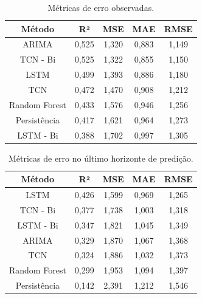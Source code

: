 
\begin{table}[h] %
    \centering
    \begin{tabular}{|c|c|c|c|c|}
    \hline
    \textbf{Método} & \textbf{R²} & \textbf{MSE} & \textbf{MAE} & \textbf{RMSE} \\ \hline
    ARIMA & 0,525 & 1,320 & 0,883 & 1,149 \\ \hline
    TCN - Bi & 0,525 & 1,322 & 0,855 & 1,150 \\ \hline
    LSTM & 0,499 & 1,393 & 0,886 & 1,180 \\ \hline
    TCN & 0,472 & 1,470 & 0,908 & 1,212 \\ \hline
    Random Forest & 0,433 & 1,576 & 0,946 & 1,256 \\ \hline
    Persistência & 0,417 & 1,621 & 0,964 & 1,273 \\ \hline
    LSTM - Bi & 0,388 & 1,702 & 0,997 & 1,305 \\ \hline
    \end{tabular}
    \caption{Métricas de erro observadas.}
    \label{tab:error_all}
\end{table}

\begin{table}[h] %
    \centering
    \begin{tabular}{|c|c|c|c|c|}
    \hline
    \textbf{Método} & \textbf{R²} & \textbf{MSE} & \textbf{MAE} & \textbf{RMSE} \\ \hline
    LSTM & 0,426 & 1,599 & 0,969 & 1,265 \\ \hline
    TCN - Bi & 0,377 & 1,738 & 1,003 & 1,318 \\ \hline
    LSTM - Bi & 0,347 & 1,821 & 1,045 & 1,349 \\ \hline
    ARIMA & 0,329 & 1,870 & 1,067 & 1,368 \\ \hline
    TCN & 0,324 & 1,886 & 1,032 & 1,373 \\ \hline
    Random Forest & 0,299 & 1,953 & 1,094 & 1,397 \\ \hline
    Persistência & 0,142 & 2,391 & 1,212 & 1,546 \\ \hline
    \end{tabular}
    \caption{Métricas de erro no último horizonte de predição.}
    \label{tab:error_h36}
\end{table}
